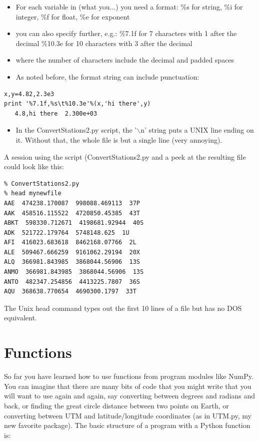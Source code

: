 \documentclass[11pt]{book}
\begin{document}
{{{\begin{itemize}
\item For each variable in (what you...) you need a format:  \%s for string, \%i for integer, \%f for float, \%e for exponent
\item you can also specify further, e.g.:
\%7.1f  for 7 characters with 1 after the decimal
\%10.3e for 10 characters with 3 after the decimal
\item where the number of characters include the decimal and padded spaces
\item As noted before, the format string can include punctuation:
\end{itemize}
{ \color{blue} \begin{verbatim}
x,y=4.82,2.3e3
print '%7.1f,%s\t%10.3e'%(x,'hi there',y)
   4.8,hi there	 2.300e+03
\end{verbatim}}
\begin{itemize}
\item In the {\color{blue}ConvertStations2.py} script, the  '$\backslash$n' string puts a UNIX line ending on it.  Without that, the whole file is but a single line (very annoying).  
\end{itemize}




\noindent A session using the script ({\color{blue}ConvertStations2.py} and a peek at the resulting file could look like this:
{ \color{blue} \begin{verbatim}
% ConvertStations2.py
% head mynewfile 
AAE  474238.170087  998088.469113  37P
AAK  458516.115522  4720850.45385  43T
ABKT  598330.712671  4198681.92944  40S
ADK  521722.179764  5748148.625  1U
AFI  416023.683618  8462168.07766  2L
ALE  509467.666259  9161062.29194  20X
ALQ  366981.843985  3868044.56906  13S
ANMO  366981.843985  3868044.56906  13S
ANTO  482347.254856  4413225.7807  36S
AQU  368638.770654  4690300.1797  33T
\end{verbatim}}

\noindent The Unix {\color{blue}head} command types out the first 10 lines of a file but has no DOS equivalent. 


\section{Functions}

So far you have learned how to use functions from program modules like {\color{blue}NumPy}.  You can imagine that there are many bits of code that you might write that you will want to use again and again, say converting between degrees and radians and back, or finding the great circle distance between two points on Earth, or converting between UTM and latitude/longitude coordinates (as in {\color{blue}UTM.py}, my new favorite package).      The basic structure of a program with a  Python function is: 


}}}
\end{document}
